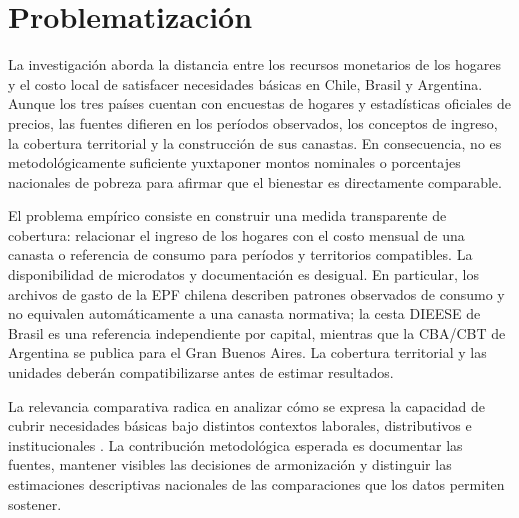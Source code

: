 \section{Problematización}

La investigación aborda la distancia entre los recursos monetarios de los hogares y el costo local de satisfacer necesidades básicas en Chile, Brasil y Argentina. Aunque los tres países cuentan con encuestas de hogares y estadísticas oficiales de precios, las fuentes difieren en los períodos observados, los conceptos de ingreso, la cobertura territorial y la construcción de sus canastas. En consecuencia, no es metodológicamente suficiente yuxtaponer montos nominales o porcentajes nacionales de pobreza para afirmar que el bienestar es directamente comparable.

El problema empírico consiste en construir una medida transparente de cobertura: relacionar el ingreso de los hogares con el costo mensual de una canasta o referencia de consumo para períodos y territorios compatibles. La disponibilidad de microdatos y documentación es desigual. En particular, los archivos de gasto de la EPF chilena describen patrones observados de consumo y no equivalen automáticamente a una canasta normativa; la cesta DIEESE de Brasil es una referencia independiente por capital, mientras que la CBA/CBT de Argentina se publica para el Gran Buenos Aires. La cobertura territorial y las unidades deberán compatibilizarse antes de estimar resultados.

La relevancia comparativa radica en analizar cómo se expresa la capacidad de cubrir necesidades básicas bajo distintos contextos laborales, distributivos e institucionales \parencite{GindlingRonconi2025, Stampinietal2025, cepalPanoramaSocialAmerica2025}. La contribución metodológica esperada es documentar las fuentes, mantener visibles las decisiones de armonización y distinguir las estimaciones descriptivas nacionales de las comparaciones que los datos permiten sostener.